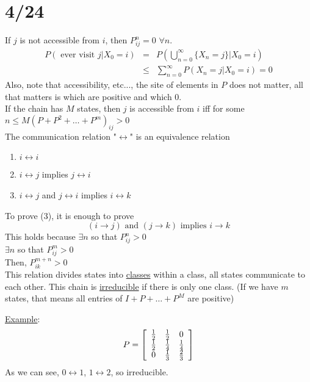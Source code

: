\section*{4/24}
  If $j$ is not accessible from $i$, then
  $P_{ij}^n = 0$ $\forall n$.\\
  \begin{eqnarray*}
    P(\text{ ever visit } j | X_0 = i)
    & = & P(\bigcup_{n = 0}^{\infty} \{ X_n = j\} | X_0 = i)\\
    & \le & \sum_{n = 0}^{\infty}P(X_n = j | X_0 = i) = 0
  \end{eqnarray*}
  Also, note that accessibility, etc..., the site of elements in $P$ does not
  matter, all that matters is which are positive and which 0.\\
  If the chain has $M$ states, then $j$ is accessible from $i$ iff for some
  $n \le M(P + P^2 + \ldots + P^m)_{ij} > 0$\\
  The communication relation "$\leftrightarrow$" is an equivalence relation
  \begin{enumerate}
    \item $i \leftrightarrow i$
    \item $i \leftrightarrow j$ implies $j \leftrightarrow i$
    \item $i \leftrightarrow j$ and $j \leftrightarrow i$ implies $i 
      \leftrightarrow k$
  \end{enumerate}
  To prove (3), it is enough to prove
  $$
    (i \rightarrow j) \text{ and } (j \rightarrow k) \text{ implies }
    i \rightarrow k
  $$
  This holds because
  $\exists n$ so that $P_{ij}^n > 0$\\
  $\exists n$ so that $P_{ij}^m > 0$\\
  Then, $P_{ik}^{m + n} > 0$\\
  This relation divides states into \underline{classes} within a class, all
  states communicate to each other. This chain is \underline{irreducible}
  if there is only one class. (If we have $m$ states, that means all entries of $I + P
  + \ldots + P^M$ are positive)

  \noindent\underline{Example}:
    $$
      P = \left[\begin{array}{c c c}
        \frac{1}{2} & \frac{1}{2} & 0\\
        \frac{1}{2} & \frac{1}{4} & \frac{1}{4}\\
        0 & \frac{1}{3} & \frac{2}{3}
      \end{array}\right]
    $$
    As we can see, $0 \leftrightarrow 1$, $1 \leftrightarrow2$, so irreducible.


